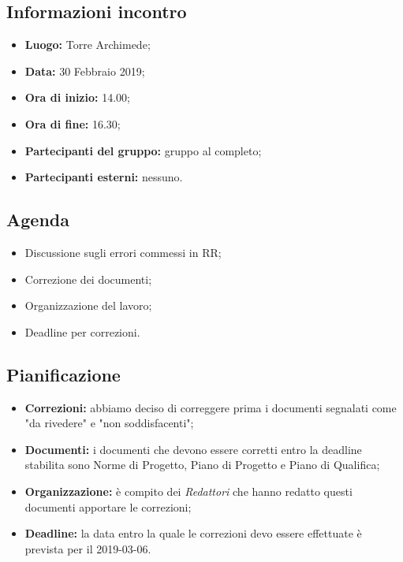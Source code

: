 \subsection{Informazioni incontro}
\begin{itemize}
	\item { \textbf{Luogo:} Torre Archimede};
	\item { \textbf{Data:} 30 Febbraio 2019};
	\item { \textbf{Ora di inizio:} 14.00};
	\item { \textbf{Ora di fine:} 16.30};
	\item { \textbf{Partecipanti del gruppo:} gruppo al completo};
	\item { \textbf{Partecipanti esterni:} nessuno}.
\end{itemize}


\subsection{Agenda}
\begin{itemize}
	\item {Discussione sugli errori commessi in RR;}
	\item {Correzione dei documenti;}
	\item {Organizzazione del lavoro;}
	\item {Deadline per correzioni.}
\end{itemize}

\subsection{Pianificazione}
\begin{itemize}
	\item { \textbf{Correzioni:} abbiamo deciso di correggere prima i documenti segnalati come "da rivedere" e "non soddisfacenti";}
	\item{ \textbf{Documenti:} i documenti che devono essere corretti entro la deadline stabilita sono Norme di Progetto, Piano di Progetto e Piano di Qualifica;}
	\item { \textbf{Organizzazione:} è compito dei \emph{Redattori} che hanno redatto questi documenti apportare le correzioni; }	
	\item { \textbf{Deadline:} la data entro la quale le correzioni devo essere effettuate è prevista per il 2019-03-06.}
\end{itemize}

